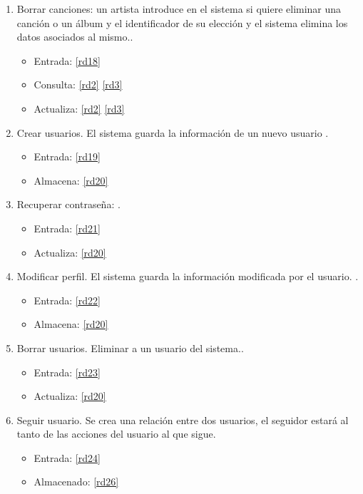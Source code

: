 \documentclass[12pt,a4paper]{article}
\begin{document}
\begin{enumerate}[label=\textnormal{RF\arabic*}]
	 \item Borrar canciones: un artista introduce en el sistema si quiere eliminar una canción o un álbum y el identificador de su elección y el sistema elimina los datos asociados al mismo.\label{rf11}.
    	\begin{itemize}
			\item Entrada: \ref{rd18}
			\item Consulta: \ref{rd2} \ref{rd3} 
			\item Actualiza: \ref{rd2} \ref{rd3} 
		\end{itemize}
		
		
	 \item Crear usuarios. El sistema guarda la información de un nuevo usuario \label{rf12}.
    	\begin{itemize}
			\item Entrada: \ref{rd19}
			\item Almacena: \ref{rd20}
		\end{itemize}
		
	 \item Recuperar contraseña: \label{rf13}.
    	\begin{itemize}
			\item Entrada: \ref{rd21}
			\item Actualiza: \ref{rd20}
		\end{itemize}
		
	 \item Modificar perfil. El sistema guarda la información modificada por el usuario. \label{rf14}.
    	\begin{itemize}
			\item Entrada: \ref{rd22}
			\item Almacena: \ref{rd20}
		\end{itemize}
		
	 \item Borrar usuarios. Eliminar a un usuario del sistema.\label{rf15}.
    	\begin{itemize}
			\item Entrada: \ref{rd23}
			\item Actualiza: \ref{rd20}
		\end{itemize}
		
		
	 \item Seguir usuario. Se crea una relación entre dos usuarios, el seguidor estará al tanto de las acciones del usuario al que sigue. \label{rf16}
	 	\begin{itemize}
			\item Entrada: \ref{rd24}
			\item Almacenado: \ref{rd26}
		\end{itemize}
	

\end{enumerate}
\end{document}
